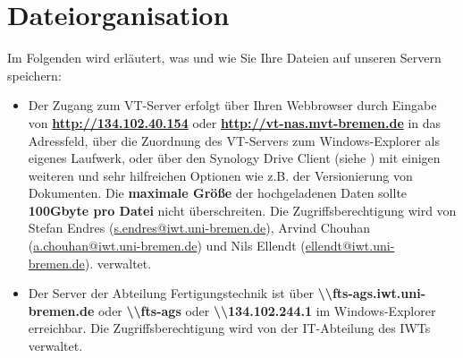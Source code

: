 \section{Dateiorganisation}
Im Folgenden wird erläutert, was und wie Sie Ihre Dateien auf unseren Servern
speichern:
\begin{itemize}
  \item Der Zugang zum VT-Server erfolgt über Ihren Webbrowser durch Eingabe von
        \textbf{\url{http://134.102.40.154}} oder
        \textbf{\url{http://vt-nas.mvt-bremen.de}}
        in das Adressfeld, über die Zuordnung des VT-Servers zum
        Windows-Explorer als eigenes Laufwerk, oder über den Synology Drive
        Client (siehe \cite{synology2022}) mit einigen weiteren und sehr
        hilfreichen Optionen wie z.B. der Versionierung von Dokumenten.
        Die \textbf{maximale Größe} der hochgeladenen Daten sollte
        \textbf{100Gbyte pro Datei} nicht überschreiten. Die
        Zugriffsberechtigung wird von
        Stefan Endres (\href{mailto:s.endres@iwt.uni-bremen.de}%
                       {s.endres@iwt.uni-bremen.de}),
        Arvind Chouhan (\href{mailto:a.chouhan@iwt.uni-bremen.de}%
                        {a.chouhan@iwt.uni-bremen.de})
        und Nils Ellendt (\href{mailto:ellendt@iwt.uni-bremen.de}%
                          {ellendt@iwt.uni-bremen.de}).
        verwaltet.
  \item Der Server der Abteilung Fertigungstechnik ist über
        \textbf{\textbackslash\textbackslash fts-ags.iwt.uni-bremen.de}
        oder \textbf{\textbackslash\textbackslash fts-ags}
        oder \textbf{\textbackslash\textbackslash 134.102.244.1} im
        Windows-Explorer erreichbar. Die Zugriffsberechtigung wird von der
        IT-Abteilung des IWTs verwaltet.
\end{itemize}

